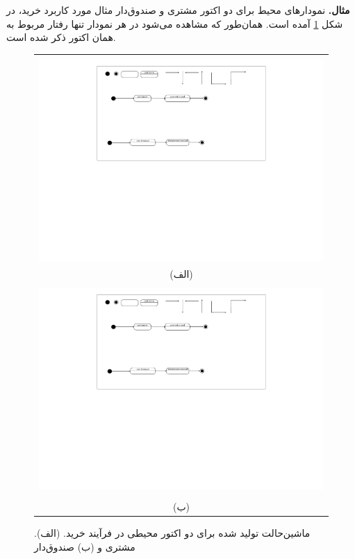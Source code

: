 \textbf{مثال. } نمودارهای محیط برای دو اکتور مشتری و صندوق‌دار مثال مورد کاربرد خرید، در شکل \ref{fig:purchaseEnv} آمده است. همان‌طور که مشاهده می‌شود در هر نمودار تنها رفتار مربوط به همان اکتور ذکر شده است. 
\begin{figure}
    \begin{center}
    \begin{tabular}{| c |}
   	\hline
	\\
  	 \includegraphics[width=12cm]{4-ProposedFramework/Figures/purchaseCust.pdf} \\
	(الف)\\ 
	\hline
	\\
 	 \includegraphics[width=12cm]{4-ProposedFramework/Figures/purchaseCash.pdf} \\
	\\	
	(ب)\\ 
	\hline
  \end{tabular}
  \end{center}
   \caption{\label{fig:purchaseEnv} ماشین‌حالت تولید شده برای دو اکتور محیطی در فرآیند خرید. (الف). مشتری و (ب) صندوق‌دار}
\end{figure}

